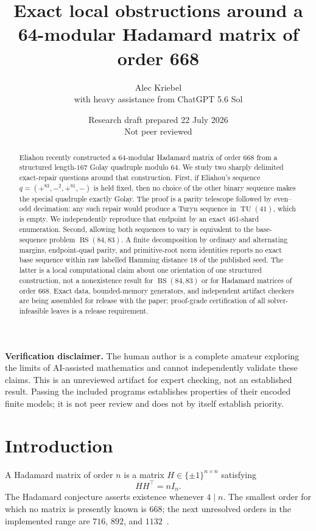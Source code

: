 \documentclass[11pt]{article}
\title{Exact local obstructions around a\\
64-modular Hadamard matrix of order 668}
\author{Alec Kriebel\\[2pt]\large with heavy assistance from ChatGPT 5.6 Sol}
\date{Research draft prepared 22 July 2026\\Not peer reviewed}
\newcommand{\BS}{\operatorname{BS}}
\newcommand{\TU}{\operatorname{TU}}
\begin{document}
\maketitle

\begin{abstract}
Eliahou recently constructed a 64-modular Hadamard matrix of order $668$
from a structured length-$167$ Golay quadruple modulo $64$.  We study two
sharply delimited exact-repair questions around that construction.  First,
if Eliahou's sequence $q=(+^{83},-^2,+^{81},-)$ is held fixed, then no
choice of the other binary sequence makes the special quadruple exactly
Golay.  The proof is a parity telescope followed by even--odd decimation:
any such repair would produce a Turyn sequence in $\TU(41)$, which is empty.
We independently reproduce that endpoint by an exact 461-shard enumeration.
Second, allowing both sequences to vary is equivalent to the base-sequence
problem $\BS(84,83)$.  A finite decomposition by ordinary and alternating
margins, endpoint-quad parity, and primitive-root norm identities reports no
exact base sequence within raw labelled Hamming distance $18$ of the
published seed.  The latter is a local computational claim about one
orientation of one structured construction, not a nonexistence result for
$\BS(84,83)$ or for Hadamard matrices of order $668$.  Exact data,
bounded-memory generators, and independent artifact checkers are being
assembled for release with the paper; proof-grade certification of all
solver-infeasible leaves is a release requirement.
\end{abstract}

\noindent\textbf{Verification disclaimer.}
The human author is a complete amateur exploring the limits of AI-assisted
mathematics and cannot independently validate these claims.  This is an
unreviewed artifact for expert checking, not an established result.  Passing
the included programs establishes properties of their encoded finite models;
it is not peer review and does not by itself establish priority.

\section{Introduction}

A Hadamard matrix of order $n$ is a matrix
$H\in\{\pm1\}^{n\times n}$ satisfying
\[
 HH^\top=nI_n.
\]
The Hadamard conjecture asserts existence whenever $4\mid n$.  The smallest
order for which no matrix is presently known is $668$; the next unresolved
orders in the implemented range are $716$, $892$, and
$1132$~\cite{cati-pasechnik,sage}.
\end{document}
